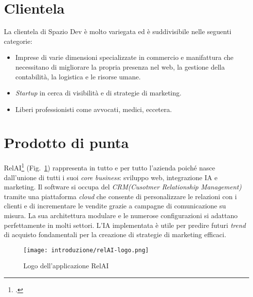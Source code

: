 \section{Clientela}
La clientela di Spazio Dev è molto variegata ed è suddivisibile nelle seguenti categorie:
\begin{itemize}
  \item Imprese di varie dimensioni specializzate in commercio e manifattura che necessitano di migliorare la propria presenza nel web, la gestione della contabilità, la logistica e le risorse umane.
  \item \emph{Startup} in cerca di visibilità e di strategie di marketing.
  \item Liberi professionisti come avvocati, medici, eccetera.
\end{itemize}



\section{Prodotto di punta}
RelAI\footcite{site:relai} (Fig.~\ref{fig:logo-RelAI}) rappresenta in tutto e per tutto l'azienda poiché nasce dall'unione di tutti i suoi \emph{core business}: sviluppo web, integrazione IA e marketing.
Il software si occupa del \emph{\gls{CRM}\glsfirstoccur (Cusotmer Relationship Management)}  tramite una piattaforma \emph{cloud} che consente di personalizzare le relazioni con i clienti e di incrementare le vendite grazie a campagne di comunicazione su misura.
La sua architettura modulare e le numerose configurazioni si adattano perfettamente in molti settori. L'IA implementata è utile per predire futuri \emph{trend} di acquisto fondamentali per la creazione di strategie di marketing efficaci. 


\begin{figure}[!h] 
  \centering 
  \texttt{[image: introduzione/relAI-logo.png]} 
  \caption{Logo dell'applicazione RelAI}
  \label{fig:logo-RelAI}
\end{figure}


